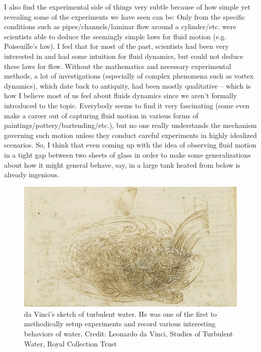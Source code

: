 \documentclass[11pt]{article}
\begin{document}
I also find the experimental side of things very subtle because of how simple yet revealing some of the experiments we have seen can be: Only from the specific conditions such as pipes/channels/laminar flow around a cylinder/etc. were scientists able to deduce the seemingly simple laws for fluid motion (e.g. Poiseuille's law). I feel that for most of the past, scientists had been very interested in and had some intuition for fluid dynamics, but could not deduce these laws for flow. Without the mathematics and necessary experimental methods, a lot of investigations (especially of complex phenomena such as vortex dynamics), which date back to antiquity, had been mostly qualitative -- which is how  I believe most of us feel about fluids dynamics since we aren't formally introduced to the topic. Everybody seems to find it very fascinating (some even make a career out of capturing fluid motion in various forms of paintings/pottery/bartending/etc.), but no one really understands the mechanism governing such motion unless they conduct careful experiments in highly idealized scenarios. So, I think that even coming up with the idea of observing fluid motion in a tight gap between two sheets of glass in order to make some generalizations about how it might general behave, say, in a large tank heated from below is already ingenious. 


\begin{figure}[!htb]
	\centering
	\includegraphics[scale=0.5]{davinci}
	\caption{da Vinci's sketch of turbulent water. He was one of the first to methodically setup experiments and record various interesting behaviors of water. Credit: Leonardo da Vinci, Studies of Turbulent Water, Royal Collection Trust}
	\label{fig:davinci}
\end{figure} 
\end{document}
